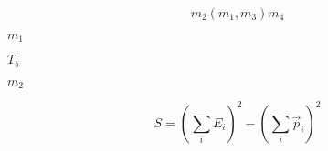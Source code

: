 \documentclass{article}
\begin{document}
\begin{equation} m_2(m_1,m_3)m_4 \end{equation}
\pagebreak

$m_1$
\pagebreak

$T_b$
\pagebreak

$m_2$
\pagebreak

\begin{equation} S = \left(\sum_i E_i\right)^2 - \left(\sum_i \vec{p}_{i}\right)^2 \end{equation}
\pagebreak
\end{document}
